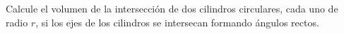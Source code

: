\item Calcule el volumen de la intersección de dos cilindros circulares, cada uno de radio $r$, si los ejes de los cilindros se intersecan formando ángulos rectos.
